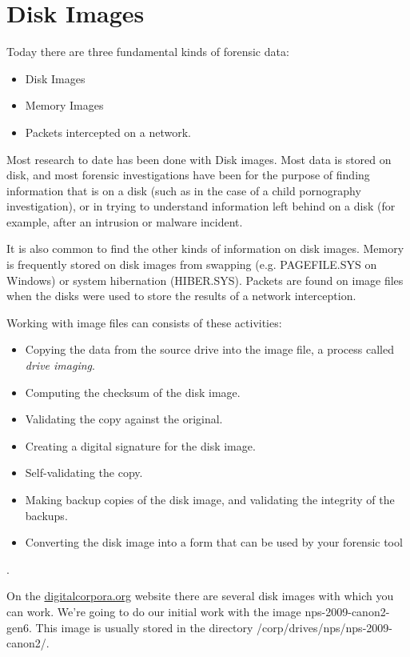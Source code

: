 \chapter{Disk Images}

Today there are three fundamental kinds of forensic data:

\begin{itemize}
\item Disk Images
\item Memory Images
\item Packets intercepted on a network.
\end{itemize}

Most research to date has been done with Disk images. Most data is
stored on disk, and most forensic investigations have been for the
purpose of finding information that is on a disk (such as in the case
of a child pornography investigation), or in trying to understand
information left behind on a disk (for example, after an intrusion or
malware incident.

It is also common to find the other kinds of information on disk
images. Memory is frequently stored on disk images from swapping
(e.g. PAGEFILE.SYS on Windows) or system hibernation
(HIBER.SYS). Packets are found on image files when the disks were used
to store the results of a network interception.

Working with image files can consists of these activities:


\begin{itemize}
\item Copying the data from the source drive into the image file, a
  process called \emph{drive imaging}.
\item Computing the checksum of the disk image.
\item Validating the copy against the original.
\item Creating a digital signature for the disk image.
\item Self-validating the copy.
\item Making backup copies of the disk image, and validating the integrity
  of the backups.
\item Converting the disk image into a form that can be used by your
  forensic tool
\end{itemize}.

On the \url{digitalcorpora.org} website there are several disk images with
which you can work. We're going to do our initial work with the image
nps-2009-canon2-gen6. This image is usually stored in the directory
/corp/drives/nps/nps-2009-canon2/.

